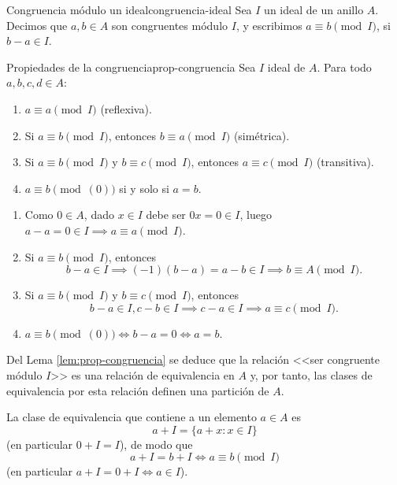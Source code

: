 \begin{definition}{Congruencia módulo un ideal}{congruencia-ideal}
    Sea \(I\) un ideal de un anillo \(A\). Decimos que \(a, b \in A\) son {congruentes módulo \(I\)}, y escribimos \(a \equiv b \pmod{I}\), si \(b - a \in I\).
\end{definition}

\begin{lemma}{Propiedades de la congruencia}{prop-congruencia}
    Sea \(I\) ideal de \(A\). Para todo \(a, b, c, d \in A\):
    \begin{enumerate}
        \item \(a \equiv a \pmod{I}\) (reflexiva).
        \item Si \(a \equiv b \pmod{I}\), entonces \(b \equiv a \pmod{I}\) (simétrica).
        \item Si \(a \equiv b \pmod{I}\) y \(b \equiv c \pmod{I}\), entonces \(a \equiv c \pmod{I}\) (transitiva).
        \item \(a \equiv b \pmod{(0)}\) si y solo si \(a = b\).
    \end{enumerate}
\end{lemma}

\begin{proofbox}
    \begin{enumerate}
        \item Como $0 \in A$, dado $x \in I$ debe ser $0x = 0 \in I$, luego \(a - a = 0 \in I \implies a \equiv a \pmod{I}\).
        \item Si \(a \equiv b \pmod{I}\), entonces
        \[
        b - a \in I \implies (-1)(b-a) = a - b \in I \implies b \equiv A \pmod{I}.
        \]
        \item Si \(a \equiv b \pmod{I}\) y \(b \equiv c \pmod{I}\), entonces
        \[
        b - a \in I, c - b \in I \implies c - a \in I \implies a \equiv c \pmod{I}.
        \]
        \item \(a \equiv b \pmod{(0)} \iff b - a = 0 \iff a = b\).
    \end{enumerate}
\end{proofbox}

Del Lema \ref{lem:prop-congruencia} se deduce que la relación <<ser congruente módulo $I$>> es una relación de equivalencia en $A$ y, por tanto, las clases de equivalencia por esta relación definen una partición de $A$. 

La clase de equivalencia que contiene a un elemento $a \in A$ es
\[
a + I = \{a + x : x \in I\}
\]
(en particular $0 + I = I$), de modo que
\[
a + I = b + I \Leftrightarrow a \equiv b \pmod{I}
\]
(en particular $a + I = 0 + I \Leftrightarrow a \in I$). 

